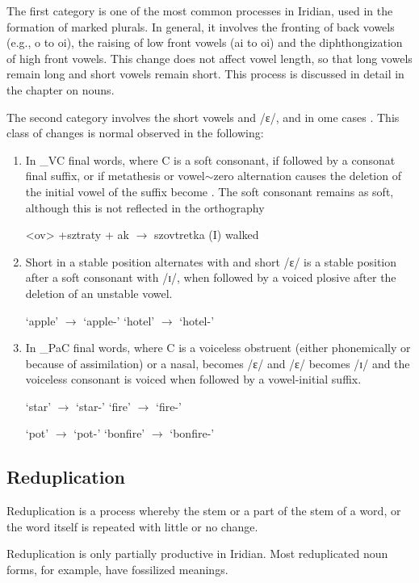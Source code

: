 The first category is one of the most common processes in Iridian, used in the formation of marked plurals. In general, it involves the fronting of back vowels (e.g., o to oi), the raising of low front vowels (ai to oi) and the diphthongization of high front vowels. This change does not affect vowel length, so that long vowels remain long and short vowels remain short. This process is discussed in detail in the chapter on nouns.

The second category involves the short vowels  and /ɛ/, and in ome cases . This class of changes is normal observed in the following:

\begin{enumerate}
	\item In \_VC final words, where C is a soft consonant, if followed by a consonat final suffix, or if metathesis or vowel$\sim$zero alternation causes the deletion of the initial vowel of the suffix  become . The soft consonant remains as soft, although this is not reflected in the orthography

		\pex
	\a <ov> +sztraty + ak $\rightarrow$ szovtretka (I) walked
	\xe
	\item Short  in a stable position alternates with  and short /ɛ/ is a stable position after a soft consonant with /ɪ/, when followed by a voiced plosive after the deletion of an unstable vowel.

	\pex
	\a {} `apple' $\rightarrow$  `apple-'
	\a {} `hotel' $\rightarrow$  `hotel-'
	\xe

	\item In \_PaC final words, where C is a voiceless obstruent (either phonemically or because of assimilation) or a nasal,  becomes /ɛ/ and /ɛ/ becomes /ɪ/ and the voiceless consonant is voiced when followed by a vowel-initial suffix.

		\pex
	\a {} `star' $\rightarrow$  `star-'
	\a {} `fire' $\rightarrow$  `fire-'
	\xe

	\pex
	\a {} `pot' $\rightarrow$  `pot-'
	\a {} `bonfire' $\rightarrow$  `bonfire-'
	\xe

\end{enumerate}



\subsection{Reduplication}
\par Reduplication is a process whereby the stem or a part of the stem of a word, or the word itself is repeated with little or no change.
\par Reduplication is only partially productive in Iridian. Most reduplicated noun forms, for example, have fossilized meanings.

